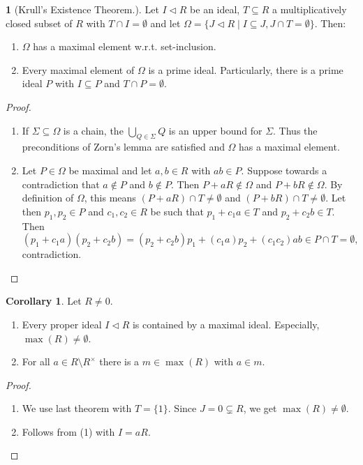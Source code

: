 \documentclass[12pt,a4paper]{report}
\theoremstyle{definition}
\newtheorem{corollary}[theorem]{Corollary} %
\theoremstyle{num.custom-title}
\newtheorem{teo_custom-title}[theorem]{} %
\DeclareMathOperator{\sm}{\setminus}
\DeclareMathOperator{\sse}{\subseteq}
\begin{document}
\begin{teo_custom-title}[Krull's Existence Theorem.] Let $I \lhd R$ be an ideal, $T \sse R$ a multiplicatively closed subset of $R$ with $T \cap I = \emptyset$ and let $\Omega=\{J \lhd R \mid I \sse J, J \cap T = \emptyset\}$. Then:
\begin{enumerate}
\item $\Omega$ has a maximal element w.r.t. set-inclusion.
\item Every maximal element of $\Omega$ is a prime ideal. Particularly, there is a prime ideal $P$ with $I \sse P$ and $T \cap P = \emptyset$.
\end{enumerate}
\begin{proof}\ 
\begin{enumerate}
\item If $\Sigma \sse \Omega$ is a chain, the $\bigcup_{Q \in \Sigma} Q$ is an upper bound for $\Sigma$. Thus the preconditions of Zorn's lemma are satisfied and $\Omega$ has a maximal element.
\item Let $P \in \Omega$ be maximal and let $a,b \in R$ with $ab \in P$. Suppose towards a contradiction that $a \not\in P$ and $b \not\in P$. Then $P+aR \not\in \Omega$ and $P+bR \not\in \Omega$. By definition of $\Omega$, this means $(P+aR) \cap T \neq \emptyset$ and $(P+bR) \cap T \neq \emptyset$. Let then $p_1,p_2 \in P$ and $c_1,c_2 \in R$ be such that $p_1+c_1 a \in T$ and $p_2+c_2 b \in T$. Then
\[
(p_1+c_1 a)(p_2+c_2 b)=(p_2+c_2 b)p_1 + (c_1 a) p_2 + (c_1 c_2)ab \in P \cap T = \emptyset,
\]
contradiction.
\end{enumerate}
\end{proof}
\end{teo_custom-title}

\begin{corollary}
Let $R \neq 0$.
\begin{enumerate}
\item Every proper ideal $I \lhd R$ is contained by a maximal ideal. Especially, $\max(R) \neq \emptyset$.
\item For all $a \in R \sm R^\times$ there is a $m \in \max(R)$ with $a \in m$.
\end{enumerate}
\begin{proof}\ 
\begin{enumerate}
\item We use last theorem with $T=\{1\}$. Since $J=0 \subsetneq R$, we get $\max(R) \neq \emptyset$.
\item Follows from (1) with $I=aR$.
\end{enumerate}
\end{proof}
\end{corollary}
\end{document}
